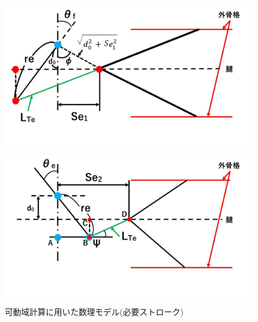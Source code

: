 \begin{figure}[ht]
  \begin{minipage}{0.49\hsize}
    \centering  
    \includegraphics[scale=0.23]{image/model_1.jpg}
    \label{fig:model_1_before}
  \end{minipage}
  \begin{minipage}{0.49\hsize}
    \centering
    \includegraphics[scale=0.23]{image/model_2.jpg}
    \label{fig:model_1_after}
  \end{minipage}
  \caption{可動域計算に用いた数理モデル(必要ストローク)}
  \label{fig:model_1}
\end{figure}
%
